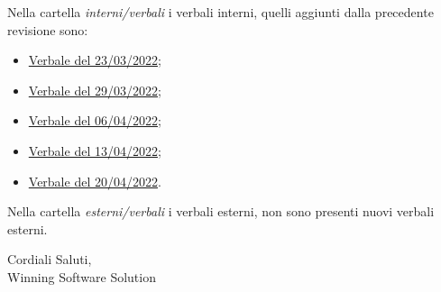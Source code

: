 \documentclass[a4paper, 12pt]{letter}
\begin{document}
Nella cartella \textit{interni/verbali} i verbali interni, quelli aggiunti dalla precedente revisione sono:
\begin{itemize}
    \item \href{https://github.com/iota97/WinningSoftwareSolution/tree/main/public/interni/verbali/2022_03_23_I.pdf}{Verbale del 23/03/2022};
    \item \href{https://github.com/iota97/WinningSoftwareSolution/tree/main/public/interni/verbali/2022_03_29_I.pdf}{Verbale del 29/03/2022};
    \item \href{https://github.com/iota97/WinningSoftwareSolution/tree/main/public/interni/verbali/2022_04_06_I.pdf}{Verbale del 06/04/2022};
    \item \href{https://github.com/iota97/WinningSoftwareSolution/tree/main/public/interni/verbali/2022_04_13_I.pdf}{Verbale del 13/04/2022};
    \item \href{https://github.com/iota97/WinningSoftwareSolution/tree/main/public/interni/verbali/2022_04_20_I.pdf}{Verbale del 20/04/2022}.
\end{itemize}

Nella cartella \textit{esterni/verbali} i verbali esterni, non sono presenti nuovi verbali esterni.

\begin{flushright}
Cordiali Saluti,\\
Winning Software Solution
\end{flushright}
\end{document}
